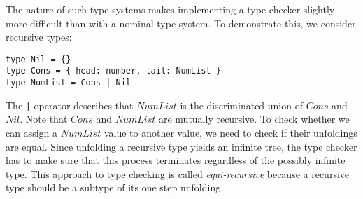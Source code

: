 The nature of such type systems makes implementing a type checker slightly more difficult than with a nominal type system.
To demonstrate this, we consider recursive types:
\begin{lstlisting}
type Nil = {}
type Cons = { head: number, tail: NumList }
type NumList = Cons | Nil
\end{lstlisting}

The \texttt{|} operator describes that $NumList$ is the discriminated union of $Cons$ and $Nil$.
Note that $Cons$ and $NumList$ are mutually recursive.
To check whether we can assign a $NumList$ value to another value, 
we need to check if their unfoldings are equal.
Since unfolding a recursive type yields an infinite tree, 
the type checker has to make sure that this process terminates regardless of the possibly infinite type.
This approach to type checking is called \textit{equi-recursive} because a recursive type should
be a subtype of its one step unfolding.
